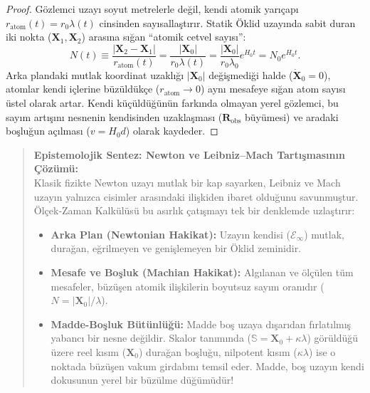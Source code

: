 \begin{proof}
    Gözlemci uzayı soyut metrelerle değil, kendi atomik yarıçapı $r_{\mathrm{atom}}(t) = r_0 \lambda(t)$ cinsinden sayısallaştırır. Statik Öklid uzayında sabit duran iki nokta ($\mathbf{X}_1, \mathbf{X}_2$) arasına sığan ``atomik cetvel sayısı'':
    \begin{equation}
        N(t) \equiv \frac{|\mathbf{X}_2 - \mathbf{X}_1|}{r_{\mathrm{atom}}(t)} = \frac{|\mathbf{X}_0|}{r_0 \lambda(t)} = \frac{|\mathbf{X}_0|}{r_0 \lambda_0} e^{H_0 t} = N_0 e^{H_0 t}.
        \label{eq:cetvel_sayimi_ispat}
    \end{equation}
    Arka plandaki mutlak koordinat uzaklığı $|\mathbf{X}_0|$ değişmediği halde ($\dot{\mathbf{X}}_0 = 0$), atomlar kendi içlerine büzüldükçe ($r_{\mathrm{atom}} \to 0$) aynı mesafeye sığan atom sayısı üstel olarak artar. Kendi küçüldüğünün farkında olmayan yerel gözlemci, bu sayım artışını nesnenin kendisinden uzaklaşması ($\mathbf{R}_{\mathrm{obs}}$ büyümesi) ve aradaki boşluğun açılması ($v = H_0 d$) olarak kaydeder.
\end{proof}

\begin{quote}
    \small
    \textbf{Epistemolojik Sentez: Newton ve Leibniz--Mach Tartışmasının Çözümü:} \\
    Klasik fizikte Newton uzayı mutlak bir kap sayarken, Leibniz ve Mach uzayın yalnızca cisimler arasındaki ilişkiden ibaret olduğunu savunmuştur. Ölçek-Zaman Kalkülüsü bu asırlık çatışmayı tek bir denklemde uzlaştırır:
    \begin{itemize}
        \item \textbf{Arka Plan (Newtonian Hakikat):} Uzayın kendisi ($\mathcal{E}_\infty$) mutlak, durağan, eğrilmeyen ve genişlemeyen bir Öklid zeminidir.
        \item \textbf{Mesafe ve Boşluk (Machian Hakikat):} Algılanan ve ölçülen tüm mesafeler, büzüşen atomik ilişkilerin boyutsuz sayım oranıdır ($N = |\mathbf{X}_0|/\lambda$).
        \item \textbf{Madde-Boşluk Bütünlüğü:} Madde boş uzaya dışarıdan fırlatılmış yabancı bir nesne değildir. Skalor tanımında ($\mathbb{S} = \mathbf{X}_0 + \kappa \lambda$) görüldüğü üzere reel kısım ($\mathbf{X}_0$) durağan boşluğu, nilpotent kısım ($\kappa \lambda$) ise o noktada büzüşen vakum girdabını temsil eder. Madde, boş uzayın kendi dokusunun yerel bir büzülme düğümüdür!
    \end{itemize}
\end{quote}

